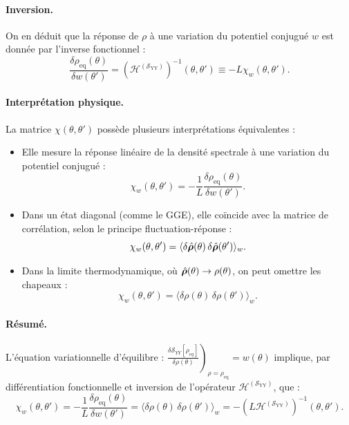\paragraph{Inversion.}
On en déduit que la réponse de $\rho$ à une variation du potentiel conjugué $w$ est donnée par l'inverse fonctionnel :
\[
\frac{\delta \rho_{\mathrm{eq}}(\theta)}{\delta w(\theta')} = \left( \mathcal{H}^{(\mathcal{S}_{\mathrm{YY}})} \right)^{-1} (\theta, \theta') \equiv - L \chi_w(\theta, \theta').
\]


\paragraph{Interprétation physique.}
La matrice $\chi(\theta, \theta')$ possède plusieurs interprétations équivalentes :
\begin{itemize}[label = $\bullet$]
  \item Elle mesure la réponse linéaire de la densité spectrale à une variation du potentiel conjugué :
  \[
  \chi_w(\theta, \theta') = - \frac{1}{L}\frac{\delta \rho_{\mathrm{eq}}(\theta)}{\delta w(\theta')}.
  \]
  \item Dans un état diagonal (comme le GGE), elle coïncide avec la matrice de corrélation, selon le principe fluctuation-réponse :
  \[
  \chi_w(\theta, \theta') = \langle \delta \hat{\bm{\rho}}(\theta)\, \delta \hat{\bm{\rho}}(\theta') \rangle_w.
  \]
  \item Dans la limite thermodynamique, où $\hat{\bm{\rho}}(\theta) \to \rho(\theta)$, on peut omettre les chapeaux :
  \[
  \chi_w(\theta, \theta') = \langle \delta \rho(\theta)\, \delta \rho(\theta') \rangle_w.
  \]
\end{itemize}

\paragraph{Résumé.}
L'équation variationnelle d'équilibre :
\(
\left.\frac{\delta \mathcal{S}_{YY}[\rho_{eq}]}{\delta \rho(\theta)} \right)_{\rho = \rho_{\mathrm{eq}}} = w(\theta)
\)
implique, par différentiation fonctionnelle et inversion de l’opérateur $\mathcal{H}^{(\mathcal{S}_{\mathrm{YY}})}$, que :
\[
\chi_w(\theta, \theta') =   - \frac{1}{L}\frac{\delta \rho_{\mathrm{eq}}(\theta)}{\delta w(\theta')} = \langle \delta \rho(\theta)\, \delta \rho(\theta') \rangle_w  = - \left( L \mathcal{H}^{(\mathcal{S}_{\mathrm{YY}})} \right)^{-1} (\theta, \theta') .
\]

